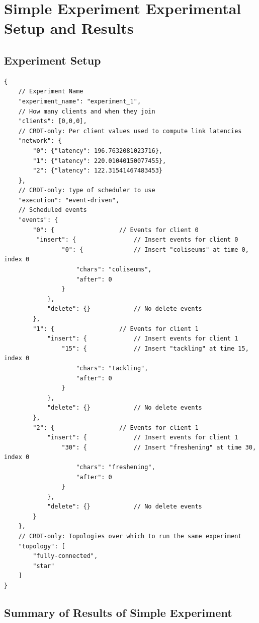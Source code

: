 \documentclass[12pt,a4paper,twoside,openright]{report}
\begin{document}
\chapter{Simple Experiment Experimental Setup and Results}

\section{Experiment Setup}
\label{appendix:simpleexpsetup}


\begin{lstlisting}
{
    // Experiment Name
    "experiment_name": "experiment_1", 	
    // How many clients and when they join
    "clients": [0,0,0],		
    // CRDT-only: Per client values used to compute link latencies	
    "network": {				
        "0": {"latency": 196.7632081023716}, 
        "1": {"latency": 220.01040150077455}, 
        "2": {"latency": 122.31541467483453}
    },
    // CRDT-only: type of scheduler to use
    "execution": "event-driven", 	
    // Scheduled events
    "events": {						
        "0": {					// Events for client 0
         "insert": {				// Insert events for client 0
                "0": {				// Insert "coliseums" at time 0, index 0
                    "chars": "coliseums", 
                    "after": 0
                }
            }, 
            "delete": {}			// No delete events
        }, 
        "1": {					// Events for client 1
            "insert": {				// Insert events for client 1
                "15": {				// Insert "tackling" at time 15, index 0
                    "chars": "tackling", 		
                    "after": 0
                }
            }, 
            "delete": {}			// No delete events
        }, 
        "2": {					// Events for client 1
            "insert": {				// Insert events for client 1
                "30": {				// Insert "freshening" at time 30, index 0
                    "chars": "freshening", 
                    "after": 0
                }
            }, 
            "delete": {}			// No delete events
        }
	},
    // CRDT-only: Topologies over which to run the same experiment
    "topology": [					
        "fully-connected", 
        "star"
    ]
}
\end{lstlisting}

\section{Summary of Results of Simple Experiment}
\label{appendix:simplelogsummary}
\end{document}
